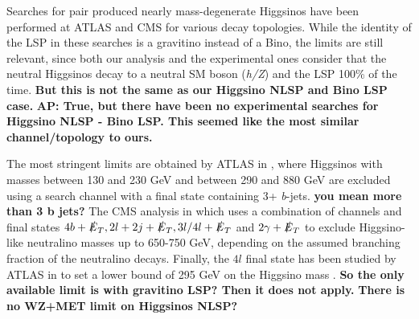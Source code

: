 \documentclass[a4paper,11pt]{article}
\newcommand{\Shufang}[1]{{\bf\color{Maroon}  #1}}
\newcommand{\Adarsh}[1]{{\bf\color{RoyalBlue} AP: #1}}
\begin{document}
 

Searches for pair produced nearly mass-degenerate Higgsinos  have been performed 
at ATLAS and CMS for various decay  topologies. While the identity of the 
LSP in these searches is a gravitino  instead of a Bino,   the limits are still  relevant, since both  our analysis  and the experimental ones consider that  
the neutral Higgsinos decay to a  neutral SM boson (\emph{h/Z})  and the 
LSP 100\% of the time.  \Shufang{But this is not the same as our Higgsino NLSP
and Bino LSP case.} \Adarsh{True, but there have been no experimental searches
for Higgsino NLSP - Bino LSP. This seemed like the most similar
channel/topology to ours.}

The most stringent limits are obtained by ATLAS in \cite{Aaboud:2018htj},
where Higgsinos with masses between 130 and 230 GeV and between 290 and 880 
GeV are excluded using a search channel with a final state containing 3+ 
\emph{b}-jets. \Shufang{you mean more than 3 b jets?} The CMS analysis
in \cite{Sirunyan:2017ubx} which uses a combination of channels and final states 
$4b+\slashed{E}_T, 2l + 2j + \slashed{E}_T, 3l/4l + \slashed{E}_T$ and $2\gamma+\slashed{E}_T$ 
to exclude Higgsino-like neutralino masses up to 650-750 GeV, depending on the assumed branching 
fraction of the neutralino decays. Finally, the $4l$ final state has been studied by ATLAS in \cite{Aaboud:2018zeb}
to set a lower bound of 295 GeV on the Higgsino mass  \cite{Aaboud:2018zeb}.
\Shufang{So the only available limit is with gravitino LSP?  Then it does not apply.}
\Shufang{There is no  WZ+MET limit on Higgsinos NLSP?}



\end{document}
